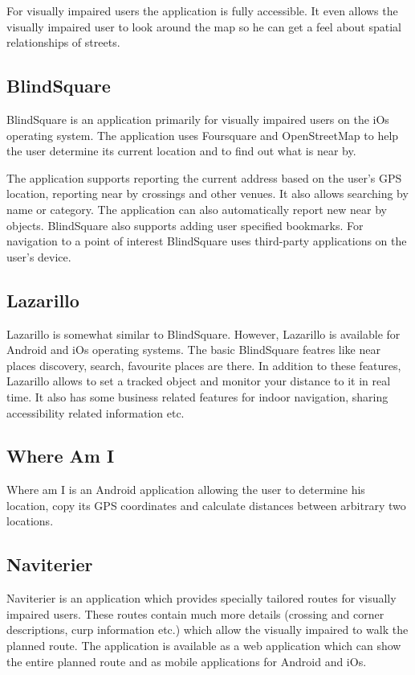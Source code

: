 \documentclass[nolof,digital]{fithesis3}
\begin{document}
For visually impaired users the application is fully accessible. It even allows the visually impaired user to look around the map so he can get a feel about spatial relationships of streets.
\subsection{BlindSquare}
BlindSquare \parencite{blindsquare} is an application primarily for visually impaired users on the iOs operating system. The application uses Foursquare and OpenStreetMap to help the user determine its current location and to find out what is near by.

The application supports reporting the current address based on the user's GPS location, reporting near by crossings and other venues. It also allows searching by name or category. The application can also automatically report new near by objects. BlindSquare also supports adding user specified bookmarks. For navigation to a point of interest BlindSquare uses third-party applications on the user's device.
\subsection{Lazarillo}
Lazarillo \parencite{lazarillo} is somewhat similar to BlindSquare. However, Lazarillo is available for Android and iOs operating systems. The basic BlindSquare featres like near places discovery, search, favourite places are there. In addition to these features, Lazarillo allows to set a tracked object and monitor your distance to it in real time. It also has some business related features for indoor navigation, sharing accessibility related information etc.
\subsection{Where Am I}
Where am I \parencite{whereami} is an Android application allowing the user to determine his location, copy its GPS coordinates and calculate distances between arbitrary two locations.
\subsection{Naviterier}
Naviterier \parencite{naviterier} is an application which provides specially tailored routes for visually impaired users. These routes contain much more details (crossing and corner descriptions, curp information etc.) which allow the visually impaired to walk the planned route. The application is available as a web application which can show the entire planned route and as mobile applications for Android and iOs.
\end{document}
